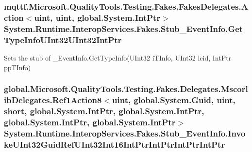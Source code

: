 \hypertarget{class_system_1_1_runtime_1_1_interop_services_1_1_fakes_1_1_stub___event_info_a09481f37137f86a1ced5fbfa50d92f89}{
\subsubsection[{Get\-Type\-Info\-U\-Int32\-U\-Int32\-Int\-Ptr}]{\setlength{\rightskip}{0pt plus 5cm}mqttf.\-Microsoft.\-Quality\-Tools.\-Testing.\-Fakes.\-Fakes\-Delegates.\-Action$<$uint, uint, global.\-System.\-Int\-Ptr$>$ System.\-Runtime.\-Interop\-Services.\-Fakes.\-Stub\-\_\-\-Event\-Info.\-Get\-Type\-Info\-U\-Int32\-U\-Int32\-Int\-Ptr}}\label{class_system_1_1_runtime_1_1_interop_services_1_1_fakes_1_1_stub___event_info_a09481f37137f86a1ced5fbfa50d92f89}


Sets the stub of \-\_\-\-Event\-Info.\-Get\-Type\-Info(\-U\-Int32 i\-T\-Info, U\-Int32 lcid, Int\-Ptr pp\-T\-Info)

\hypertarget{class_system_1_1_runtime_1_1_interop_services_1_1_fakes_1_1_stub___event_info_af769e4a3884039ea7754e3f9d268e54d}{
\subsubsection[{Invoke\-U\-Int32\-Guid\-Ref\-U\-Int32\-Int16\-Int\-Ptr\-Int\-Ptr\-Int\-Ptr\-Int\-Ptr}]{\setlength{\rightskip}{0pt plus 5cm}global.\-Microsoft.\-Quality\-Tools.\-Testing.\-Fakes.\-Delegates.\-Mscorlib\-Delegates.\-Ref1\-Action8$<$uint, global.\-System.\-Guid, uint, short, global.\-System.\-Int\-Ptr, global.\-System.\-Int\-Ptr, global.\-System.\-Int\-Ptr, global.\-System.\-Int\-Ptr$>$ System.\-Runtime.\-Interop\-Services.\-Fakes.\-Stub\-\_\-\-Event\-Info.\-Invoke\-U\-Int32\-Guid\-Ref\-U\-Int32\-Int16\-Int\-Ptr\-Int\-Ptr\-Int\-Ptr\-Int\-Ptr}}\label{class_system_1_1_runtime_1_1_interop_services_1_1_fakes_1_1_stub___event_info_af769e4a3884039ea7754e3f9d268e54d}


